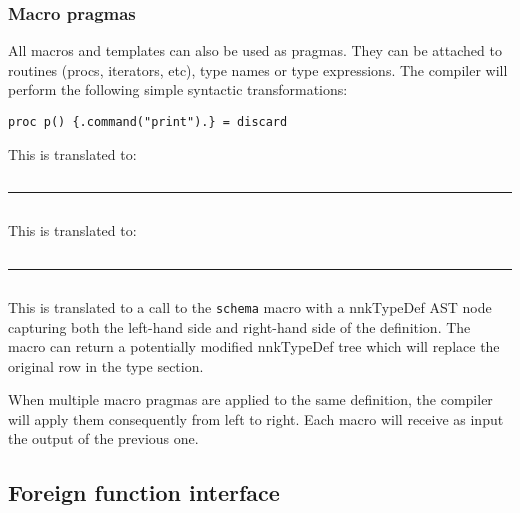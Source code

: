 \begin{verbatim}
\end{verbatim}

\hypertarget{macro-pragmas}{%
\subsubsection{Macro pragmas}\label{macro-pragmas}}

All macros and templates can also be used as pragmas. They can be
attached to routines (procs, iterators, etc), type names or type
expressions. The compiler will perform the following simple syntactic
transformations:

\begin{verbatim}
proc p() {.command("print").} = discard
\end{verbatim}

This is translated to:

\begin{verbatim}
\end{verbatim}

\begin{center}\rule{0.5\linewidth}{0.5pt}\end{center}

\begin{verbatim}
\end{verbatim}

This is translated to:

\begin{verbatim}
\end{verbatim}

\begin{center}\rule{0.5\linewidth}{0.5pt}\end{center}

\begin{verbatim}
\end{verbatim}

This is translated to a call to the \texttt{schema} macro with a
{nnkTypeDef} AST node capturing both the left-hand side and right-hand
side of the definition. The macro can return a potentially modified
{nnkTypeDef} tree which will replace the original row in the type
section.

When multiple macro pragmas are applied to the same definition, the
compiler will apply them consequently from left to right. Each macro
will receive as input the output of the previous one.

\hypertarget{foreign-function-interface}{%
\subsection{Foreign function
interface}\label{foreign-function-interface}}

